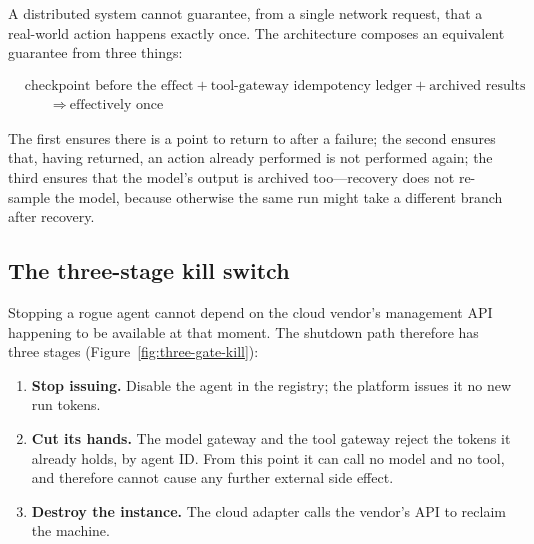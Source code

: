A distributed system cannot guarantee, from a single network request, that a real-world action happens exactly once. The architecture composes an equivalent guarantee from three things:

\begin{align*}
  &\text{checkpoint before the effect}
  + \text{tool-gateway idempotency ledger}
  + \text{archived results}\\
  &\qquad\Rightarrow\ \text{effectively once}
\end{align*}

The first ensures there is a point to return to after a failure; the second ensures that, having returned, an action already performed is not performed again; the third ensures that the model's output is archived too---recovery does not re-sample the model, because otherwise the same run might take a different branch after recovery.

\subsection{The three-stage kill switch}

Stopping a rogue agent cannot depend on the cloud vendor's management API happening to be available at that moment. The shutdown path therefore has three stages (Figure~\ref{fig:three-gate-kill}):

\begin{enumerate}
  \item \textbf{Stop issuing.} Disable the agent in the registry; the platform issues it no new run tokens.
  \item \textbf{Cut its hands.} The model gateway and the tool gateway reject the tokens it already holds, by agent ID. From this point it can call no model and no tool, and therefore cannot cause any further external side effect.
  \item \textbf{Destroy the instance.} The cloud adapter calls the vendor's API to reclaim the machine.
\end{enumerate}

